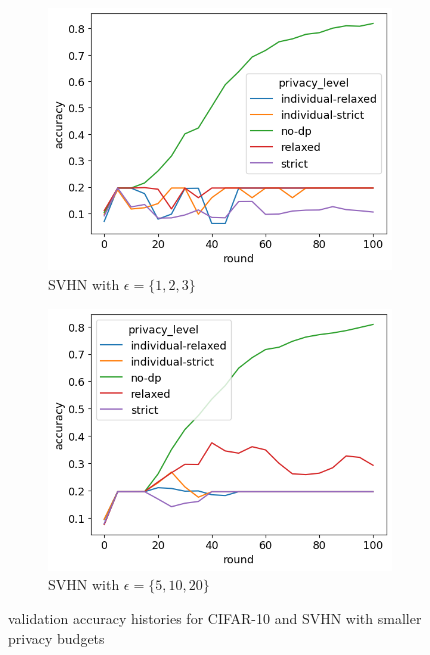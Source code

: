 \begin{figure}[tb]
\begin{subfigure}{0.45\textwidth}
		\includegraphics[width=\linewidth]{Bilder/svhn-accuracy-eps-1-2-3.png}
		\caption{SVHN with $\epsilon = \{1,2,3\}$}
	\end{subfigure}
	\begin{subfigure}{0.45\textwidth}
		\centering
		\includegraphics[width=\linewidth]{Bilder/svhn-accuracy-eps-5-10-20.png}
		\caption{SVHN with $\epsilon = \{5,10,20\}$}
	\end{subfigure}
	\caption{validation accuracy histories for CIFAR-10 and SVHN with smaller privacy budgets}
	\label{fig:cifar-svhn-small-budgets}
\end{figure}